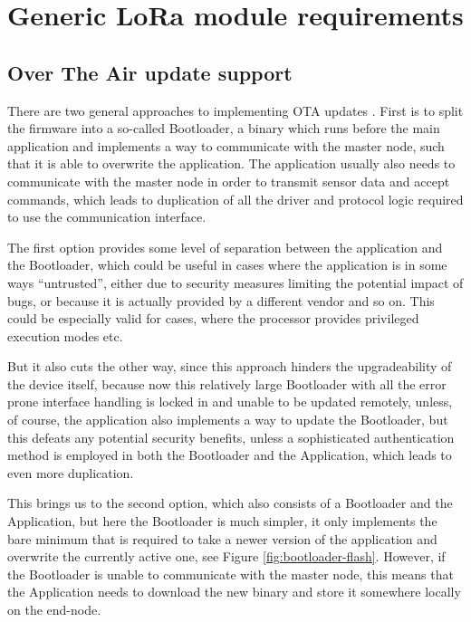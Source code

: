 \section{Generic LoRa module requirements}
\subsection{\label{section:ota-update-support}Over The Air update support}
There are two general approaches to implementing OTA updates \cite{bucklin_brown_over--air_2024,noauthor_android_2024}. First is to split the firmware into a so-called Bootloader, a binary which runs before the main application and implements a way to communicate with the master node, such that it is able to overwrite the application. The application usually also needs to communicate with the master node in order to transmit sensor data and accept commands, which leads to duplication of all the driver and protocol logic required to use the communication interface.

The first option provides some level of separation between the application and the Bootloader, which could be useful in cases where the application is in some ways ``untrusted'', either due to security measures limiting the potential impact of bugs, or because it is actually provided by a different vendor and so on. This could be especially valid for cases, where the processor provides privileged execution modes etc.

But it also cuts the other way, since this approach hinders the upgradeability of the device itself, because now this relatively large Bootloader with all the error prone interface handling is locked in and unable to be updated remotely, unless, of course, the application also implements a way to update the Bootloader, but this defeats any potential security benefits, unless a sophisticated authentication method is employed in both the Bootloader and the Application, which leads to even more duplication.

This brings us to the second option, which also consists of a Bootloader and the Application, but here the Bootloader is much simpler, it only implements the bare minimum that is required to take a newer version of the application and overwrite the currently active one, see Figure \ref{fig:bootloader-flash}. However, if the Bootloader is unable to communicate with the master node, this means that the Application needs to download the new binary and store it somewhere locally on the end-node.

